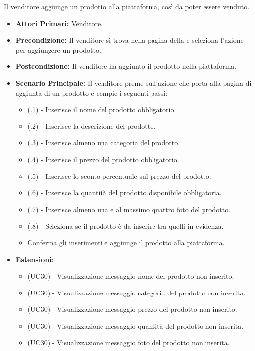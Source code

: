 Il venditore aggiunge un prodotto alla piattaforma, così da poter essere venduto.
\begin{itemize}
    \item \textbf{Attori Primari:} Venditore.
    \item \textbf{Precondizione:} Il venditore si trova nella pagina della  e seleziona l'azione per aggiungere un prodotto.
    \item \textbf{Postcondizione:} Il venditore ha aggiunto il prodotto nella piattaforma.
    \item \textbf{Scenario Principale:} Il venditore preme sull'azione che porta alla pagina di aggiunta di un prodotto e compie i seguenti passi:
    \begin{itemize}
        \item (\actualUC.1) - Inserisce il nome del prodotto obbligatorio.
        \item (\actualUC.2) - Inserisce la descrizione del prodotto.
        \item (\actualUC.3) - Inserisce almeno una categoria del prodotto.
        \item (\actualUC.4) - Inserisce il prezzo del prodotto obbligatorio.
        \item (\actualUC.5) - Inserisce lo sconto percentuale sul prezzo del prodotto.
        \item (\actualUC.6) - Inserisce la quantità del prodotto disponibile obbligatoria.
        \item (\actualUC.7) - Inserisce almeno una e al massimo quattro foto del prodotto.
        \item (\actualUC.8) - Seleziona se il prodotto è da inserire tra quelli in evidenza.
        \item Conferma gli inserimenti e aggiunge il prodotto alla piattaforma.
    \end{itemize}
    \item \textbf{Estensioni:}
    \begin{itemize}
        \item (UC30) - Visualizzazione messaggio nome del prodotto non inserito.
        \item (UC30) - Visualizzazione messaggio categoria del prodotto non inserita.
        \item (UC30) - Visualizzazione messaggio prezzo del prodotto non inserito.
        \item (UC30) - Visualizzazione messaggio quantità del prodotto non inserita.
        \item (UC30) - Visualizzazione messaggio foto del prodotto non inserita.
    \end{itemize}
\end{itemize}

